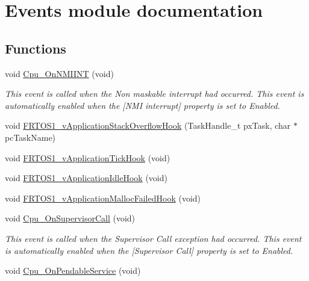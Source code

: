 \hypertarget{group___events__module}{}\section{Events module documentation}
\label{group___events__module}
\subsection*{Functions}
\begin{DoxyCompactItemize}
\item 
void \hyperlink{group___events__module_ga960d094664356278ac5472d45a6ea2f3}{Cpu\+\_\+\+On\+N\+M\+I\+I\+NT} (void)
\begin{DoxyCompactList}\small\item\em This event is called when the Non maskable interrupt had occurred. This event is automatically enabled when the \mbox{[}N\+MI interrupt\mbox{]} property is set to \textquotesingle{}Enabled\textquotesingle{}. \end{DoxyCompactList}\item 
void \hyperlink{group___events__module_ga1e81c467b899cd40c827a5243d259dee}{F\+R\+T\+O\+S1\+\_\+v\+Application\+Stack\+Overflow\+Hook} (Task\+Handle\+\_\+t px\+Task, char $\ast$pc\+Task\+Name)
\item 
void \hyperlink{group___events__module_gaf8fe6769cea9aeb943962871b26b203b}{F\+R\+T\+O\+S1\+\_\+v\+Application\+Tick\+Hook} (void)
\item 
void \hyperlink{group___events__module_ga47ee4f5ef904e733b7690af3ef89a1b0}{F\+R\+T\+O\+S1\+\_\+v\+Application\+Idle\+Hook} (void)
\item 
void \hyperlink{group___events__module_ga83b87d2e8c6b269bbdc03cf06d1164a2}{F\+R\+T\+O\+S1\+\_\+v\+Application\+Malloc\+Failed\+Hook} (void)
\item 
void \hyperlink{group___events__module_ga428b28484a15546393b77d621e3f074d}{Cpu\+\_\+\+On\+Supervisor\+Call} (void)
\begin{DoxyCompactList}\small\item\em This event is called when the Supervisor Call exception had occurred. This event is automatically enabled when the \mbox{[}Supervisor Call\mbox{]} property is set to \textquotesingle{}Enabled\textquotesingle{}. \end{DoxyCompactList}\item 
void \hyperlink{group___events__module_ga8ae22afd184f10ce1e5d0870ef5d602e}{Cpu\+\_\+\+On\+Pendable\+Service} (void)

\end{DoxyCompactItemize}
